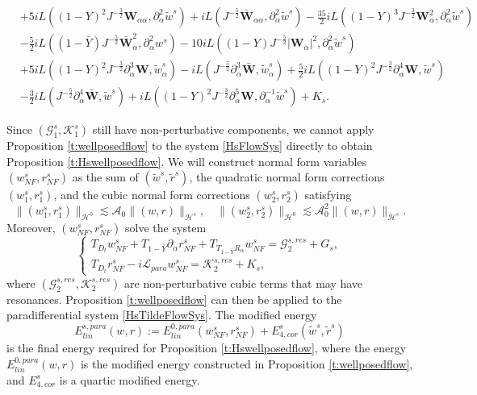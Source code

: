 \documentclass[10pt]{amsart}
\theoremstyle{remark}
\theoremstyle{definition}
\numberwithin{equation}{section}
\newcommand{\p}{\partial}
\renewcommand{\H}{{\mathcal H }}
\newcommand{\al}{\alpha}
\newcommand{\f}{\frac}
\newcommand{\bw}{\mathbf{W}}
\newcommand{\CalAZ}{{\mathcal{A}_0}}
\begin{document}
\begin{align*}
& +5iL((1-Y)^2J^{-\f32}\bw_{\al\al}, \p_\al^2 \tilde{w}^s) +iL(J^{-\f52}\bar{\bw}_{\al\al}, \p_\al^2 \tilde{w}^s)- \f{35}{2}iL((1-Y)^3J^{-\f32}\bw_{\al}^2, \p_\al^2 \tilde{w}^s) \\ 
&-\f52iL((1-\bar{Y})J^{-\f52}\bar{\bw}_{\al}^2, \p_\al^2 w^s)- 10iL((1-Y)J^{-\f52}|\bw_{\al}|^2, \p_\al^2 \tilde{w}^s) \\ 
&+5iL((1-Y)^2J^{-\f32}\p_\al^3\bw,  \tilde{w}^s_\al)- iL(J^{-\f52}\p_\al^3\bar{\bw}, \tilde{w}^s_\al)  + \f52i L((1-Y)^2J^{-\f32}\p_\al^4\bw,  \tilde{w}^s) \\ 
&-\f32iL(J^{-\f52}\p_\al^4 \bar{\bw}, \tilde{w}^s) + iL((1-Y)^2J^{-\f32}\p_\al^5\bw,  \p_\al^{-1}\tilde{w}^s)+K_s.
\end{align*}

Since $(\mathcal{G}^s_1, \mathcal{K}^s_1)$ still have non-perturbative components, we cannot apply Proposition \ref{t:wellposedflow} to the system \eqref{HsFlowSys} directly to obtain Proposition \ref{t:Hswellposedflow}.
We will construct normal form variables $(w_{NF}^s, r_{NF}^s)$ as the sum of $(\tilde{w}^s, \tilde{r}^s)$, the quadratic normal form corrections $(w^s_1, r^s_1)$, and the cubic normal form corrections $(w^s_2, r^s_2)$ satisfying
\begin{equation*}
    \|(w^s_1, r^s_1)\|_{\H^0} \lesssim \CalAZ \|(w,r)\|_{\H^s}, \quad \|(w^s_2, r^s_2)\|_{\H^0} \lesssim \mathcal{A}^2_0 \|(w,r)\|_{\H^s}.
\end{equation*}
Moreover, $(w_{NF}^s, r_{NF}^s)$ solve the system  
\begin{equation}  \label{HsTildeFlowSys}
\begin{cases}
T_{D_t}w_{NF}^s +T_{1-\bar{Y}}\partial_{\al} r_{NF}^s+T_{T_{1-\bar{Y}}R_{\al}}w_{NF}^s= \mathcal{G}^{s, res}_{2}+G_s,\\
T_{D_t}r_{NF}^s-i\mathcal{L}_{para}w_{NF}^s = \mathcal{K}^{s, res}_{2}+K_s,
\end{cases}
\end{equation}
where $(\mathcal{G}^{s, res}_{2}, \mathcal{K}^{s, res}_{2})$ are non-perturbative cubic terms that may have resonances.
Proposition \ref{t:wellposedflow} can then be applied to the paradifferential system \eqref{HsTildeFlowSys}.
The modified energy
\begin{equation} \label{EsParalinDef}
 E^{s,para}_{lin}(w, r) := E^{0,para}_{lin}(w_{NF}^s , r_{NF}^s) + E^s_{4,cor}(\tilde{w}^s, \tilde{r}^s)
\end{equation}
is the final energy required for Proposition \ref{t:Hswellposedflow},
where the energy $E^{0,para}_{lin}(w,r)$ is the modified energy constructed in Proposition \ref{t:wellposedflow}, and $E^s_{4,cor}$ is a quartic modified energy.
\end{document}
